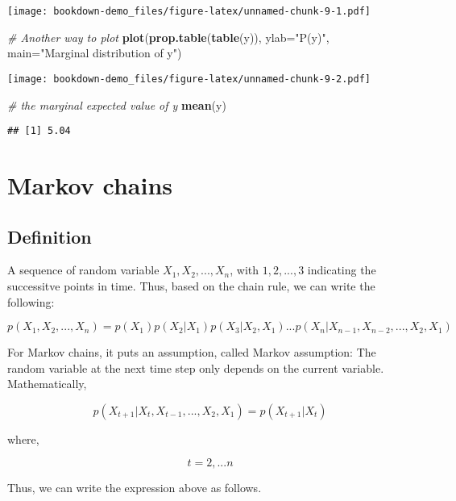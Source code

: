 \documentclass[
]{book}
\newenvironment{Shaded}{\begin{snugshade}}{\end{snugshade}}
\newcommand{\CommentTok}[1]{\textcolor[rgb]{0.56,0.35,0.01}{\textit{#1}}}
\newcommand{\DataTypeTok}[1]{\textcolor[rgb]{0.13,0.29,0.53}{#1}}
\newcommand{\KeywordTok}[1]{\textcolor[rgb]{0.13,0.29,0.53}{\textbf{#1}}}
\newcommand{\NormalTok}[1]{#1}
\newcommand{\StringTok}[1]{\textcolor[rgb]{0.31,0.60,0.02}{#1}}
\begin{document}
\texttt{[image: bookdown-demo\_files/figure-latex/unnamed-chunk-9-1.pdf]}

\begin{Shaded}
\begin{Highlighting}[]
\CommentTok{# Another way to plot }
\KeywordTok{plot}\NormalTok{(}\KeywordTok{prop.table}\NormalTok{(}\KeywordTok{table}\NormalTok{(y)), }\DataTypeTok{ylab=}\StringTok{"P(y)"}\NormalTok{, }\DataTypeTok{main=}\StringTok{"Marginal distribution of y"}\NormalTok{)}
\end{Highlighting}
\end{Shaded}

\texttt{[image: bookdown-demo\_files/figure-latex/unnamed-chunk-9-2.pdf]}

\begin{Shaded}
\begin{Highlighting}[]
\CommentTok{# the marginal expected value of y}
\KeywordTok{mean}\NormalTok{(y)}
\end{Highlighting}
\end{Shaded}

\begin{verbatim}
## [1] 5.04
\end{verbatim}

\hypertarget{markov-chains}{%
\section{Markov chains}\label{markov-chains}}

\hypertarget{definition}{%
\subsection{Definition}\label{definition}}

A sequence of random variable \(X_1, X_2,...,X_n\), with \(1, 2, ...,3\) indicating the successitve points in time. Thus, based on the chain rule, we can write the following:

\[p(X_1,X_2,...,X_n)=p(X_1)p(X_2|X_1)p(X_3|X_2,X_1)...p(X_n|X_{n-1},X_{n-2},...,X_2,X_1)\]

For Markov chains, it puts an assumption, called Markov assumption: The random variable at the next time step only depends on the current variable. Mathematically,

\[p(X_{t+1}|X_t,X_{t-1},...,X_2,X_1)=p(X_{t+1}|X_t)\]

where,

\[t=2, ...n\]

Thus, we can write the expression above as follows.
\end{document}
